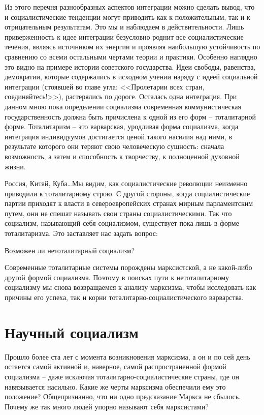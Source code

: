 \documentclass{book}
\begin{document}
Из этого перечня разнообразных аспектов интеграции можно сделать вывод, что и социалистические тенденции могут при­водить как к положительным, так и к отрицательным резуль­татам. Это мы и наблюдаем в действительности. Лишь привер­женность к идее интеграции безусловно роднит все социали­стические течения, являясь источником их энергии и проявляя наибольшую устойчивость по сравнению со всеми остальными чертами теории и практики. Особенно наглядно это видно на примере истории советского государства. Идеи свободы, ра­венства, демократии, которые содержались в исходном учении наряду с идеей социальной интеграции (стоявшей во главе угла: <<Пролетарии всех стран, соединяйтесь!>>), растерялись по доро­ге. Осталась одна интеграция. При данном мною пока опреде­лении социализма современная коммунистическая государст­венность должна быть причислена к одной из его форм -- тота­литарной форме. Тоталитаризм -- это варварская, уродливая форма социализма, когда интеграция индивидуумов достига­ется ценой такого насилия над 
ними, в результате которого они теряют свою человеческую сущность: сначала возможность, а затем и способность к творчеству, к полноценной духовной жизни.

Россия, Китай, Куба\ldots Мы видим, как социалистические ре­волюции неизменно приводили к тоталитарному строю. С дру­гой стороны, когда социалистические партии приходят к власти в североевропейских странах мирным парламентским путем, они не спешат называть свои страны социалистическими. Так что социализм, называющий себя социализмом, существует пока лишь в форме тоталитаризма. Это заставляет нас задать вопрос:

Возможен ли нетоталитарный социализм?

Современные тоталитарные системы порождены марксистской, а не какой-либо другой формой социализма. Поэтому в поисках пути к нетоталитарному социализму мы снова возвращаемся к анализу марксизма, чтобы исследовать как причины его успеха, так и корни тоталитарно-социалистического варварства.


\section{Научный социализм}

Прошло более ста лет с момента возникновения марксизма, а он и по сей день остается самой активной и, наверное, самой распространенной формой социализма -- даже исключая тота­литарно-социалистические страны, где он навязывается насиль­но. Какие же черты марксизма обеспечили ему это положение? Общепризнанно, что ни одно предсказание Маркса не сбылось. Почему же так много людей упорно называют себя маркси­стами?
\end{document}
